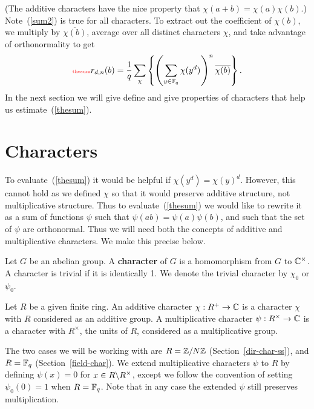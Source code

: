 (The additive characters have the nice property that $\chi(a+b)=\chi(a)\chi(b)$.) %
Note~(\ref{sum2}) is true for all characters. To extract out the coefficient of $\chi(b)$, we multiply by $\overline{\chi(b)}$, average over all distinct characters $\chi$, and take advantage of orthonormality to get
\begin{equation}\llabel{thesum}
r_{d,n}(b)=\rc q \sum_{\chi}\bc{\pa{\sum_{y\in \F_q} \chi(y^d)}^n\overline{\chi(b)}}.
\end{equation}
In the next section we will give define and give properties of characters that help us estimate~(\ref{thesum}). 

\section{Characters}
To evaluate~(\ref{thesum}) it would be helpful if $\chi(y^d)=\chi(y)^d$. However, this cannot hold as we defined $\chi$ so that it would preserve additive structure, not multiplicative structure. Thus to evaluate~(\ref{thesum}) we would like to rewrite it as a sum of functions $\psi$ such that $\psi(ab)=\psi(a)\psi(b)$, and such that the set of $\psi$ are orthonormal. Thus we will need both the concepts of additive and multiplicative characters. We make this precise below.

\begin{df}
Let $G$ be an abelian group. A \textbf{character} of $G$ is a homomorphism from $G$ to $\mathbb{C}^{\times}$. A character is trivial if it is identically 1. We denote the trivial character by $\chi_0$ or $\psi_0$.
\end{df}
\begin{df}
Let $R$ be a given finite ring. 
An additive character $\chi:R^+\to \mathbb{C}$ is a  character $\chi$ with $R$ considered as an additive group. A multiplicative character $\psi:R^{\times}\to \mathbb{C}$ is a character with $R^{\times}$, the units of $R$, considered as a multiplicative group. 
\end{df}
The two cases we will be working with are $R=\mathbb{Z}/N\mathbb{Z}$ (Section~\ref{dir-char-ss}), and $R=\mathbb{F}_q$ (Section~\ref{field-char}). We extend multiplicative characters $\psi$ to $R$ by defining $\psi(x)= 0$ for $x\in R\backslash R^{\times}$, except we follow the convention of setting $\psi_0(0)=1$ when $R=\mathbb{F}_q$. Note that in any case the extended $\psi$ still preserves multiplication.

